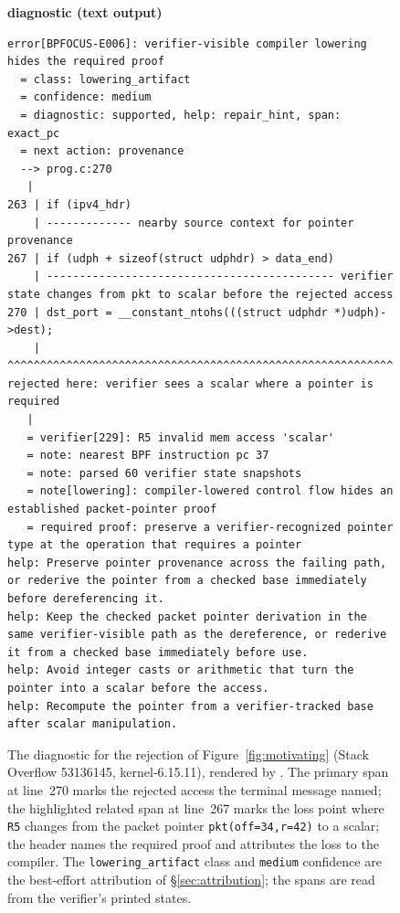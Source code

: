 \begin{figure}[t]
  \textbf{\footnotesize \sys diagnostic (\sys text output)}
  \begin{lstlisting}[style=bpfix,breaklines=true,
      emph={[1]pkt},emphstyle={[1]\color{lstgood}\bfseries},
      emph={[2]scalar},emphstyle={[2]\color{lstbad}\bfseries},
      ]
error[BPFOCUS-E006]: verifier-visible compiler lowering hides the required proof
  = class: lowering_artifact
  = confidence: medium
  = diagnostic: supported, help: repair_hint, span: exact_pc
  = next action: provenance
  --> prog.c:270
   |
263 | if (ipv4_hdr)
    | ------------- nearby source context for pointer provenance
267 | if (udph + sizeof(struct udphdr) > data_end)
    | -------------------------------------------- verifier state changes from pkt to scalar before the rejected access
270 | dst_port = __constant_ntohs(((struct udphdr *)udph)->dest);
    | ^^^^^^^^^^^^^^^^^^^^^^^^^^^^^^^^^^^^^^^^^^^^^^^^^^^^^^^^^^^ rejected here: verifier sees a scalar where a pointer is required
   |
   = verifier[229]: R5 invalid mem access 'scalar'
   = note: nearest BPF instruction pc 37
   = note: parsed 60 verifier state snapshots
   = note[lowering]: compiler-lowered control flow hides an established packet-pointer proof
   = required proof: preserve a verifier-recognized pointer type at the operation that requires a pointer
help: Preserve pointer provenance across the failing path, or rederive the pointer from a checked base immediately before dereferencing it.
help: Keep the checked packet pointer derivation in the same verifier-visible path as the dereference, or rederive it from a checked base immediately before use.
help: Avoid integer casts or arithmetic that turn the pointer into a scalar before the access.
help: Recompute the pointer from a verifier-tracked base after scalar manipulation.
  \end{lstlisting}
  \caption{The \sys diagnostic for the rejection of Figure~\ref{fig:motivating} (Stack Overflow 53136145, kernel-6.15.11), rendered by \sys. The primary span at line~270 marks the rejected access the terminal message named; the highlighted related span at line~267 marks the loss point where \texttt{R5} changes from the packet pointer \texttt{pkt(off=34,r=42)} to a scalar; the header names the required proof and attributes the loss to the compiler. The \texttt{lowering\_artifact} class and \texttt{medium} confidence are the best-effort attribution of \S\ref{sec:attribution}; the spans are read from the verifier's printed states.}
  \label{fig:diagnostic}
\end{figure}
